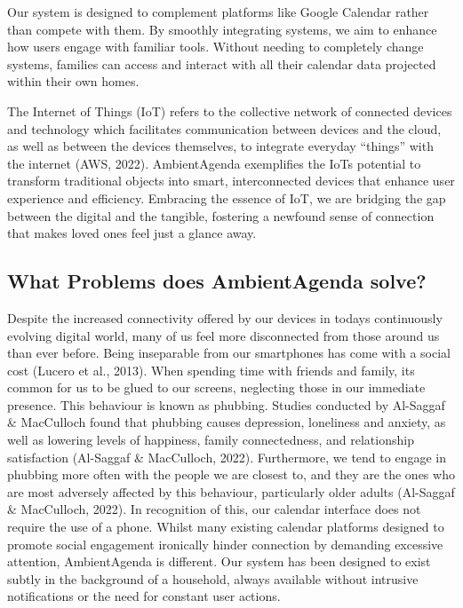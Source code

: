 \documentclass[11pt, a4, oneside]{article}
\begin{document}
\noindent Our system is designed to complement platforms like Google Calendar rather than compete with them. By smoothly integrating systems, we aim to enhance how users engage with familiar tools. Without needing to completely change systems, families can access and interact with all their calendar data projected within their own homes. \par
\medskip

\noindent The Internet of Things (IoT) refers to the collective network of connected devices and technology which facilitates communication between devices and the cloud, as well as between the devices themselves, to integrate everyday “things” with the internet (AWS, 2022). AmbientAgenda exemplifies the IoTs potential to transform traditional objects into smart, interconnected devices that enhance user experience and efficiency. Embracing the essence of IoT, we are bridging the gap between the digital and the tangible, fostering a newfound sense of connection that makes loved ones feel just a glance away. \par

\subsection{What Problems does AmbientAgenda solve?}

\noindent Despite the increased connectivity offered by our devices in todays continuously evolving digital world, many of us feel more disconnected from those around us than ever before. Being inseparable from our smartphones has come with a social cost (Lucero et al., 2013). When spending time with friends and family, its common for us to be glued to our screens, neglecting those in our immediate presence. This behaviour is known as phubbing. Studies conducted by Al-Saggaf \& MacCulloch found that phubbing causes depression, loneliness and anxiety, as well as lowering levels of happiness, family connectedness, and relationship satisfaction (Al-Saggaf \& MacCulloch, 2022). Furthermore, we tend to engage in phubbing more often with the people we are closest to, and they are the ones who are most adversely affected by this behaviour, particularly older adults (Al-Saggaf \& MacCulloch, 2022). In recognition of this, our calendar interface does not require the use of a phone. Whilst many existing calendar platforms designed to promote social engagement ironically hinder connection by demanding excessive attention, AmbientAgenda is different. Our system has been designed to exist subtly in the background of a household, always available without intrusive notifications or the need for constant user actions. \par
\medskip
\end{document}
